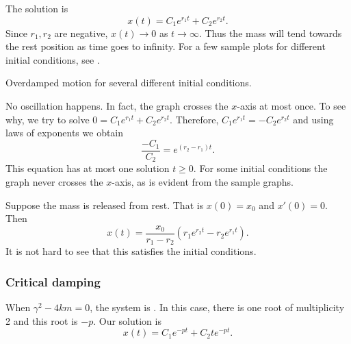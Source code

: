 The solution is
\begin{equation*}
x(t) = C_1 e^{r_1 t} + C_2 e^{r_2 t} .
\end{equation*}
Since $r_1, r_2$ are negative, $x(t) \to 0$ as $t \to \infty$.
Thus the mass will tend towards the rest position as
time goes to infinity.  For a few sample plots for different initial
conditions, see .

\begin{mywrapfig}[17]{3.25in}
\capstart
{}
\caption{Overdamped motion for several different initial conditions.\label{mv:overdampedfig}}
\end{mywrapfig}
%
%


No oscillation happens.  In fact, the graph crosses the
$x$-axis at most once.  To see why, we try to solve
$0 = C_1 e^{r_1 t} + C_2 e^{r_2 t}$.
Therefore, $C_1 e^{r_1 t} = - C_2 e^{r_2 t}$ and using laws of exponents we
obtain
\begin{equation*}
\frac{-C_1}{C_2} = e^{(r_2-r_1) t} .
\end{equation*}
This equation has at most one solution $t \geq 0$.
For some initial conditions the graph never crosses the $x$-axis, as is
evident from the sample graphs.

\begin{example}
Suppose the mass is released from rest.  That is
$x(0) = x_0$ and $x'(0) = 0$.
Then
\begin{equation*}
x(t) = \frac{x_0}{r_1-r_2} \left(r_1 e^{r_2 t} - r_2 e^{r_1 t} \right) .
\end{equation*}
It is not hard to see that this satisfies the initial conditions.
\end{example}

\subsubsection{Critical damping}

When
$\gamma^2 - 4km = 0$, the system is \emph{}.  In this case,
there is one root of multiplicity 2 and this root is $-p$.  Our solution is
\begin{equation*}
x(t) = C_1 e^{-pt} + C_2 t e^{-pt} .
\end{equation*}

